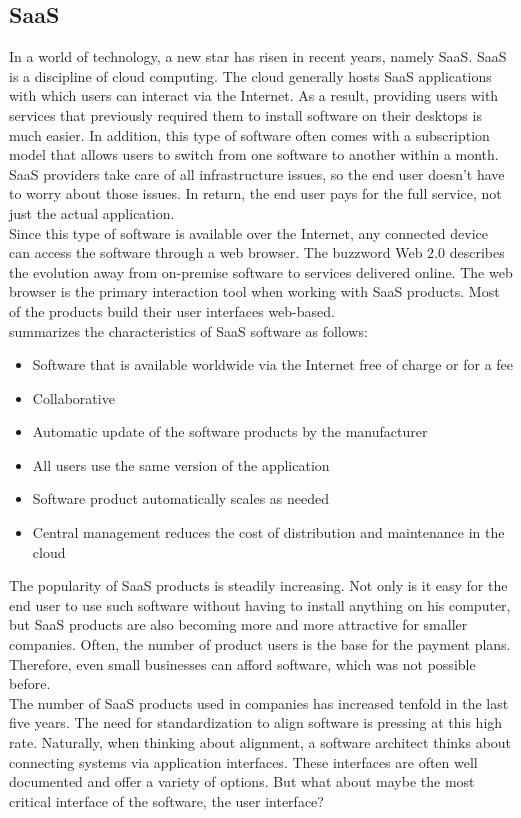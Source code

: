 \subsection{\acl{SaaS}}

In a world of technology, a new star has risen in recent years, namely \acl{SaaS}. \acl{SaaS} is a discipline of cloud computing. The cloud generally hosts \ac{SaaS} applications with which users can interact via the Internet. As a result, providing users with services that previously required them to install software on their desktops is much easier. In addition, this type of software often comes with a subscription model that allows users to switch from one software to another within a month. \\
\ac{SaaS} providers take care of all infrastructure issues, so the end user doesn’t have to worry about those issues. In return, the end user pays for the full service, not just the actual application. \\
Since this type of software is available over the Internet, any connected device can access the software through a web browser. The buzzword Web 2.0 describes the evolution away from on-premise software to services delivered online. The web browser is the primary interaction tool when working with \ac{SaaS} products. Most of the products build their user interfaces web-based. \cite{hill_guide_2013}\\
\citeauthor{hill_guide_2013} summarizes the characteristics of \ac{SaaS} software as follows:
\begin{itemize}
    \item Software that is available worldwide via the Internet free of charge or for a fee
    \item Collaborative
    \item Automatic update of the software products by the manufacturer
    \item All users use the same version of the application
    \item Software product automatically scales as needed
    \item Central management reduces the cost of distribution and maintenance in the 
    cloud
\end{itemize}
The popularity of \ac{SaaS} products is steadily increasing. Not only is it easy for the end user to use such software without having to install anything on his computer, but \ac{SaaS} products are also becoming more and more attractive for smaller companies. Often, the number of product users is the base for the payment plans. Therefore, even small businesses can afford software, which was not possible before. \cite{sury_software-as--service-modell_2020}\\
The number of \ac{SaaS} products used in companies has increased tenfold in the last five years. \cite{stastista_saas_2021} The need for standardization to align software is pressing at this high rate. Naturally, when thinking about alignment, a software architect thinks about connecting systems via application interfaces. These interfaces are often well documented and offer a variety of options. But what about maybe the most critical interface of the software, the user interface?